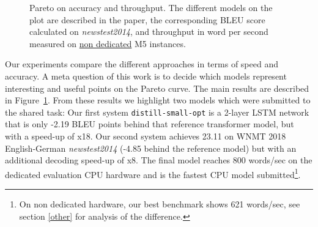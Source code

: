 \documentclass[11pt,a4paper]{article}
\begin{document}
\begin{figure}
\caption{Pareto on accuracy and throughput. The different models on the plot are described in the paper, the corresponding BLEU score calculated on {\it newstest2014}, and throughput in word per second measured on {\underline {non dedicated}} M5 instances.}
\label{fig:pareto}
\end{figure}

Our experiments compare the different approaches in terms of speed and
accuracy. A meta question of this work is to decide which models
represent interesting and useful points on the Pareto curve. The main
results are described in Figure~\ref{fig:pareto}.  From these results
we highlight two models which were submitted to the shared task: Our
first system {\tt distill-small-opt} is a 2-layer LSTM network that is only
-2.19 BLEU points behind that reference transformer model, but with a
speed-up of {x18}. Our second system achieves 23.11 on
WNMT 2018 English-German {\it newstest2014} (-4.85 behind the reference
model) but with an additional decoding speed-up of {x8}.
The final model reaches 800 words/sec on the dedicated evaluation CPU hardware and is the fastest CPU model submitted\footnote{On non dedicated hardware, our best benchmark shows 621 words/sec, see section \ref{other} for analysis of the difference.}.

\end{document}
